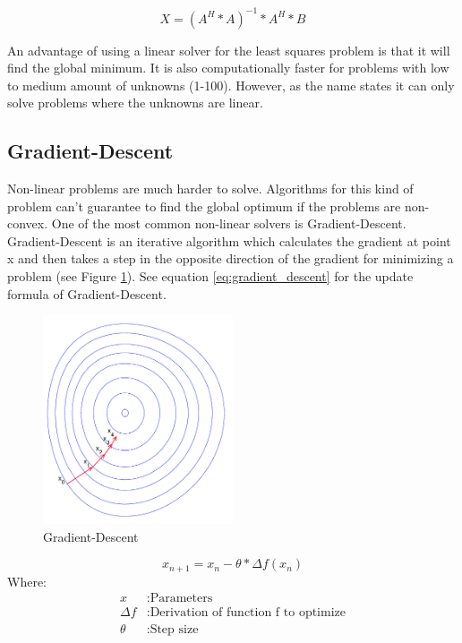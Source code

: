 \documentclass[11pt,a4paper,titlepage,oneside]{report}
\begin{document}
\begin{equation}\label{eq:least_squares_algorithm}
  X=(A^H*A)^{-1}*A^H*B 
\end{equation}

An advantage of using a linear solver for the least squares problem is that it will find the global minimum. It is also computationally faster for problems with low to medium amount of unknowns (1-100). However, as the name states it can only solve problems where the unknowns are linear.

\subsection{Gradient-Descent}

Non-linear problems are much harder to solve. Algorithms for this kind of problem can't guarantee to find the global optimum if the problems are non-convex. One of the most common non-linear solvers is Gradient-Descent. Gradient-Descent is an iterative algorithm which calculates the gradient at point x and then takes a step in the opposite direction of the gradient for minimizing a problem (see Figure \ref{fig:gradient_descent}). See equation \ref{eq:gradient_descent} for the update formula of Gradient-Descent.

\begin{figure}[H]
  \begin{center}
    \includegraphics[width=0.5\textwidth]{img/gradient_descent.png}
  \end{center}
    \caption{Gradient-Descent}\label{fig:gradient_descent}
\end{figure}

\begin{equation}\label{eq:gradient_descent}
  x_{n+1}=x_n-\theta*\Delta f(x_n)
\end{equation}
Where:
\begin{align*}
  x		      &: \text{Parameters}\\
  \Delta f  &: \text{Derivation of function f to optimize}\\
  \theta    &: \text{Step size}
\end{align*}
\end{document}
